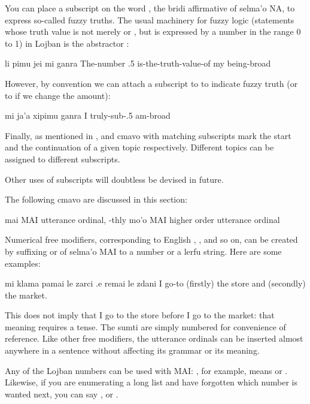 You can place a subscript on the word , the bridi
    affirmative of selma'o NA, to express so-called fuzzy truths.
    The usual machinery for fuzzy logic (statements whose truth
    value is not merely  or , but is expressed by
    a number in the range 0 to 1) in Lojban is the abstractor
    :
\begin{example}
li pimu jei mi ganra\n
The-number .5 is-the-truth-value-of my being-broad
\end{example}

However, by convention we can attach a subscript to 
    to indicate fuzzy truth (or to  if we change the
    amount):
\begin{example}
mi ja'a xipimu ganra\n
I truly-sub-.5 am-broad
\end{example}

Finally, as mentioned in , 
    and  cmavo with matching subscripts mark the start and
    the continuation of a given topic respectively. Different
    topics can be assigned to different subscripts. 

Other uses of subscripts will doubtless be devised in
    future.



The following cmavo are discussed in this section:

   mai MAI utterance ordinal, -thly
    mo'o    MAI higher order utterance ordinal

Numerical free modifiers, corresponding to English ,
    , and so on, can be created by suffixing  or
     of selma'o MAI to a number or a lerfu string. Here are
    some examples:
\begin{example}
mi klama pamai le zarci .e remai le zdani\n
I go-to (firstly) the store and (secondly) the market.
\end{example}

This does not imply that I go to the store before I go to
    the market: that meaning requires a tense. The sumti are simply
    numbered for convenience of reference. Like other free
    modifiers, the utterance ordinals can be inserted almost
    anywhere in a sentence without affecting its grammar or its
    meaning.

Any of the Lojban numbers can be used with MAI: ,
    for example, means  or . Likewise, if you
    are enumerating a long list and have forgotten which number is
    wanted next, you can say , or .

